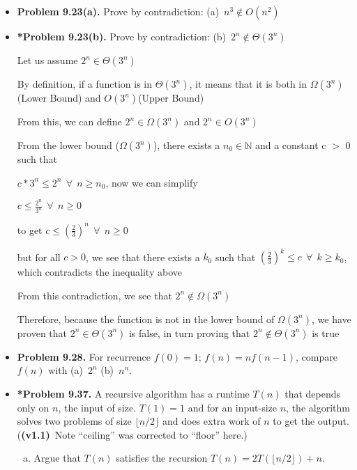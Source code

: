 \documentclass[11pt]{article}
\begin{document}
\begin{itemize}
\vspace{0.1in}

\item \textbf{Problem 9.23(a).}
Prove by contradiction: (a)~$n^3\not\in O(n^2)$

\vspace{0.1in}

\item \textbf{*Problem 9.23(b).}
Prove by contradiction: (b)~$2^n\not\in\Theta(3^n)$

\vspace*{0.15in}

Let us assume $2^n \in\Theta(3^n)$

By definition, if a function is in $\Theta(3^n)$, it means that it is both in $\Omega(3^n)$(Lower Bound) and $O(3^n)$(Upper Bound)

From this, we can define $2^n \in \Omega(3^n)$ and $2^n \in O(3^n)$ 

From the lower bound ($\Omega(3^n)$), there exists a $n_0 \in \mathbb{N}$ and a constant c $>$ 0 such that 

$c * 3^n \leq 2^n \: \: \forall \: \: n \geq n_0 $, now we can simplify

$c \leq \frac{2^n}{3^n} \: \: \forall \: \: n \geq 0$

to get $c \leq (\frac{2}{3})^n \: \: \forall \: \: n \geq 0$ 

but for all $c > 0$, we see that there exists a $k_0$ such that $(\frac{2}{3})^k \leq c \: \: \forall \: \: k \geq k_0$, which contradicts the inequality above

From this contradiction, we see that $2^n \not\in \Omega(3^n)$

Therefore, because the function is not in the lower bound of $\Omega(3^n)$, we have proven that $2^n \in \Theta(3^n)$ is false, in turn proving that $2^n \not\in \Theta(3^n)$ is true

\vspace{0.1in}

\item \textbf{Problem 9.28.}
For recurrence $f(0)=1$; $f(n)=nf(n-1)$, compare $f(n)$ with (a)~$2^n$ (b)~$n^n$.

\vspace{0.1in}

\item \textbf{*Problem 9.37.}
A recursive algorithm has a runtime $T(n)$ that depends only on $n$, the input of size.
$T(1)=1$ and for an input-size $n$, the algorithm solves two problems of size $\lfloor n/2\rfloor$
and does extra work of $n$ to get the output.
(\textbf{(v1.1)}~Note ``ceiling'' was corrected to ``floor'' here.)
\begin{enumerate}[(a)]
\item Argue that $T(n)$ satisfies the recursion $T(n)=2T(\lfloor n/2 \rfloor)+n$.


\end{enumerate}
\end{itemize}
\end{document}
